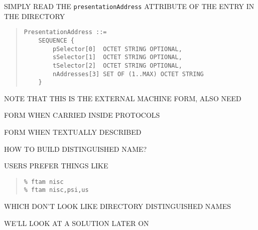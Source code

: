 \begin{bwslide}

\begin{nrtc}
\item	SIMPLY READ THE \verb"presentationAddress" ATTRIBUTE OF THE ENTRY IN
	THE DIRECTORY
\begin{quote}\small\begin{verbatim}
PresentationAddress ::=
    SEQUENCE {
        pSelector[0]  OCTET STRING OPTIONAL,
        sSelector[1]  OCTET STRING OPTIONAL,
        tSelector[2]  OCTET STRING OPTIONAL,
        nAddresses[3] SET OF (1..MAX) OCTET STRING
    }
\end{verbatim}\end{quote}

\item	NOTE THAT THIS IS THE EXTERNAL MACHINE FORM, ALSO NEED
    \begin{nrtc}
    \item	FORM WHEN CARRIED INSIDE PROTOCOLS

    \item	FORM WHEN TEXTUALLY DESCRIBED
    \end{nrtc}
\end{nrtc}
\end{bwslide}


\begin{bwslide}

\begin{nrtc}
\item	HOW TO BUILD DISTINGUISHED NAME?

\item	USERS PREFER THINGS LIKE
\begin{quote}\small\begin{verbatim}
% ftam nisc
% ftam nisc,psi,us
\end{verbatim}\end{quote}

\item	WHICH DON'T LOOK LIKE DIRECTORY DISTINGUISHED NAMES

\item	WE'LL LOOK AT A SOLUTION LATER ON
\end{nrtc}
\end{bwslide}


